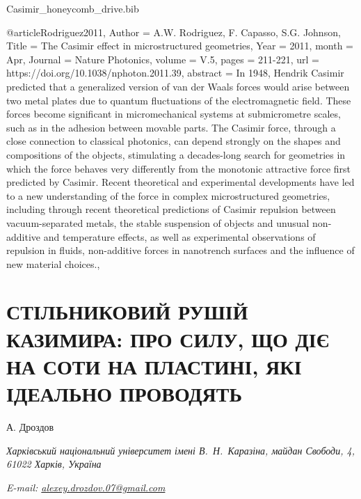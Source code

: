 \documentclass[twoside, 10pt, ptm]{article}
\makeatletter
\def\myfilename{Casimir_honeycomb_drive}
\def\mynameukr{А. Дроздов}
\def\mytitleukr{Стільниковий рушій Казимира: про силу, що діє на соти на пластині, які ідеально проводять}
\def\myemail{alexey.drozdov.07@gmail.com}
\def\myworkplaceukr{Харківський національний університет імені В.~Н.~Каразіна, майдан Свободи, 4, 61022 Харків, Україна}
\def\myorcidlink{0009-0004-1386-4534}
\newcommand{\MyTitleUkr}{\expandafter\MakeUppercase\expandafter{\mytitleukr}}
\makeatother
\begin{document}
\begin{multicols}{2}
\begin{filecontents}{\myfilename.bib}


@article{Rodriguez2011,
    Author = {A.W. Rodriguez, F. Capasso, S.G. Johnson},
    Title = {The Casimir effect in microstructured geometries},
    Year = {2011},
    month = {Apr},
    Journal = {Nature Photonics},
    volume = {V.5},
    pages = {211-221},
    url = {https://doi.org/10.1038/nphoton.2011.39},
    abstract = {In 1948, Hendrik Casimir predicted that a generalized version of van der Waals forces would arise between two metal plates due to quantum fluctuations of the electromagnetic field. These forces become significant in micromechanical systems at submicrometre scales, such as in the adhesion between movable parts. The Casimir force, through a close connection to classical photonics, can depend strongly on the shapes and compositions of the objects, stimulating a decades-long search for geometries in which the force behaves very differently from the monotonic attractive force first predicted by Casimir. Recent theoretical and experimental developments have led to a new understanding of the force in complex microstructured geometries, including through recent theoretical predictions of Casimir repulsion between vacuum-separated metals, the stable suspension of objects and unusual non-additive and temperature effects, as well as experimental observations of repulsion in fluids, non-additive forces in nanotrench surfaces and the influence of new material choices.},
}

\end{filecontents}




\end{multicols}

    

\section*{\centering \uppercase{\MyTitleUkr}}

\centerline{\Large{\mynameukr \,\orcidlink{\myorcidlink} }}
\vspace{3mm}
\centerline{\textit{\myworkplaceukr}}
\centerline{\textit{E-mail: \href{mailto:\myemail}{\myemail}}}
\end{document}
